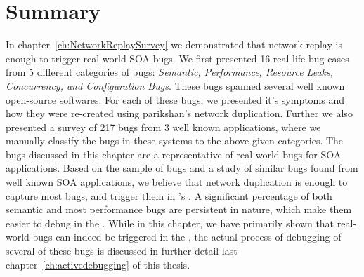 \section{Summary}
\label{sec:parikshanCaseStudySummary}

In chapter~\ref{ch:NetworkReplaySurvey} we demonstrated that network replay is enough to trigger real-world SOA bugs.
We first presented 16 real-life bug cases from 5 different categories of bugs: \emph{Semantic, Performance, Resource Leaks, Concurrency, and Configuration Bugs}.
These bugs spanned several well known open-source softwares. For each of these bugs, we presented it's symptoms and how they were re-created using parikshan's network duplication.
Further we also presented a survey of 217 bugs from 3 well known applications, where we manually classify the bugs in these systems to the above given categories.
The bugs discussed in this chapter are a representative of real world bugs for SOA applications.
Based on the sample of bugs and a study of similar bugs found from well known SOA applications, we believe that network duplication is enough to capture most bugs, and trigger them in \parikshan's \debugcontainer.	
A significant percentage of both semantic and most performance bugs are persistent in nature, which make them easier to debug in the \debugcontainer. 
While in this chapter, we have primarily shown that real-world bugs can indeed be triggered in the \debugcontainer, the actual process of debugging  of several of these bugs is discussed in further detail last chapter~\ref{ch:activedebugging} of this thesis.